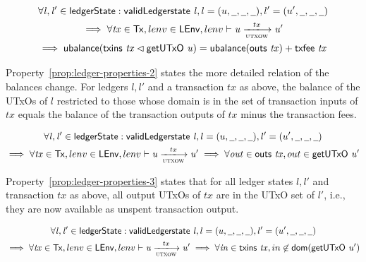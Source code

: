 \begin{property}
  \begin{multline*}
    \forall \var{l}, \var{l'} \in \ledgerState: \applyFun{validLedgerstate}{l},
    l=(u,\wcard,\wcard,\wcard), l' = (u',\wcard,\wcard,\wcard)\\
    \implies \forall \var{tx} \in \Tx, lenv \in\LEnv, lenv \vdash \var{u}
    \trans{utxow}{tx} \var{u'} \\
    \implies \fun{ubalance}(\applyFun{txins}{tx} \restrictdom
    \applyFun{getUTxO}{u}) = \fun{ubalance}(\applyFun{outs}{tx}) +
    \applyFun{txfee}{tx}
  \end{multline*}
  \label{prop:ledger-properties-2}
\end{property}

Property~\ref{prop:ledger-properties-2} states the more detailed relation of the
balances change. For ledgers $l, l'$ and a transaction $tx$ as above, the
balance of the UTxOs of $l$ restricted to those whose domain is in the set of
transaction inputs of $tx$ equals the balance of the transaction outputs of $tx$
minus the transaction fees.

\begin{property}
  \begin{multline*}
    \forall \var{l}, \var{l'} \in \ledgerState: \applyFun{validLedgerstate}{l},
    l=(u,\wcard,\wcard,\wcard), l' = (u',\wcard,\wcard,\wcard)\\
    \implies \forall \var{tx} \in \Tx, lenv \in\LEnv, lenv \vdash \var{u}
    \trans{utxow}{tx} \var{u'} \implies \forall \var{out} \in
    \applyFun{outs}{tx}, out \in \applyFun{getUTxO}{u'}
  \end{multline*}
  \label{prop:ledger-properties-3}
\end{property}

Property~\ref{prop:ledger-properties-3} states that for all ledger states
$l, l'$ and transaction $tx$ as above, all output UTxOs of $tx$ are in the UTxO
set of $l'$, i.e., they are now available as unspent transaction output.

\begin{property}
  \begin{multline*}
    \forall \var{l}, \var{l'} \in \ledgerState: \applyFun{validLedgerstate}{l},
    l=(u,\wcard,\wcard,\wcard), l' = (u',\wcard,\wcard,\wcard)\\
    \implies \forall \var{tx} \in \Tx, lenv \in\LEnv, lenv \vdash \var{u}
    \trans{utxow}{tx} \var{u'} \implies \forall \var{in} \in
    \applyFun{txins}{tx}, in \not\in \fun{dom}(\applyFun{getUTxO}{u'})
  \end{multline*}
  \label{prop:ledger-properties-4}
\end{property}

